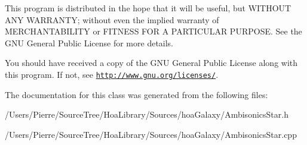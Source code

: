 This program is distributed in the hope that it will be useful, but W\-I\-T\-H\-O\-U\-T A\-N\-Y W\-A\-R\-R\-A\-N\-T\-Y; without even the implied warranty of M\-E\-R\-C\-H\-A\-N\-T\-A\-B\-I\-L\-I\-T\-Y or F\-I\-T\-N\-E\-S\-S F\-O\-R A P\-A\-R\-T\-I\-C\-U\-L\-A\-R P\-U\-R\-P\-O\-S\-E. See the G\-N\-U General Public License for more details.

You should have received a copy of the G\-N\-U General Public License along with this program. If not, see \href{http://www.gnu.org/licenses/}{\tt http\-://www.\-gnu.\-org/licenses/}. 

The documentation for this class was generated from the following files\-:\begin{DoxyCompactItemize}
\item 
/\-Users/\-Pierre/\-Source\-Tree/\-Hoa\-Library/\-Sources/hoa\-Galaxy/Ambisonics\-Star.\-h\item 
/\-Users/\-Pierre/\-Source\-Tree/\-Hoa\-Library/\-Sources/hoa\-Galaxy/Ambisonics\-Star.\-cpp\end{DoxyCompactItemize}
